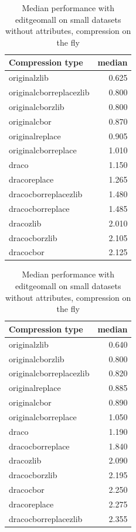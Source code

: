\begin{table}[!h]
    \begin{minipage}{.5\linewidth}
      \caption{
Median performance with editgeomall on small datasets, compression on the fly}
\centering

\begin{tabular}{|l|r|}
\hline
Compression type & median\\
\hline
originalzlib & 0.625\\
\hline
originalcborreplacezlib & 0.800\\
\hline
originalcborzlib & 0.800\\
\hline
originalcbor & 0.870\\
\hline
originalreplace & 0.905\\
\hline
originalcborreplace & 1.010\\
\hline
draco & 1.150\\
\hline
dracoreplace & 1.265\\
\hline
dracocborreplacezlib & 1.480\\
\hline
dracocborreplace & 1.485\\
\hline
dracozlib & 2.010\\
\hline
dracocborzlib & 2.105\\
\hline
dracocbor & 2.125\\
\hline
\end{tabular}
\end{minipage}%
    \begin{minipage}{.5\linewidth}
      \centering
        \caption{
Median performance with editgeomall on small datasets without attributes, compression on the fly}

\begin{tabular}{|l|r|}
\hline
Compression type & median\\
\hline
originalzlib & 0.640\\
\hline
originalcborzlib & 0.800\\
\hline
originalcborreplacezlib & 0.820\\
\hline
originalreplace & 0.885\\
\hline
originalcbor & 0.890\\
\hline
originalcborreplace & 1.050\\
\hline
draco & 1.190\\
\hline
dracocborreplace & 1.840\\
\hline
dracozlib & 2.090\\
\hline
dracocborzlib & 2.195\\
\hline
dracocbor & 2.250\\
\hline
dracoreplace & 2.275\\
\hline
dracocborreplacezlib & 2.355\\
\hline
\end{tabular}
\end{minipage} 
\end{table}



